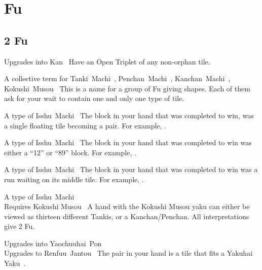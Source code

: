 \section{Fu}\label{core:sec:fu}

\subsection{2 Fu}\label{core:ssec:2-fu}

	{\upgradesto Upgrades into Kan~}
	{Have an Open Triplet of any non-orphan tile. }

	{\upgradesto A collective term for Tanki~Machi~, Penchan~Machi~, Kanchan~Machi~, Kokushi~Musou~}
	{This is a name for a group of Fu giving shapes. Each of them ask for your wait to contain one and only one type of tile.}

	{\upgradesfrom A type of Isshu~Machi~}
	{The block in your hand that was completed to win, was a single floating tile becoming a pair. For example, .}

	{\upgradesfrom A type of Isshu~Machi~}
	{The block in your hand that was completed to win was either a ``12'' or ``89'' block. For example, .}

	{\upgradesfrom A type of Isshu~Machi~}
	{The block in your hand that was completed to win was a run waiting on its middle tile. For example, .}

	{\upgradesfrom A type of Isshu~Machi~\\
	\upgradesfromother Requires Kokushi Musou~}
	{A hand with the Kokushi Musou yaku can either be viewed as thirteen different Tankis, or a Kanchan/Penchan. All interpretations give 2 Fu.}

	{\upgradesto Upgrades into Yaochuuhai~Pon~\\
	\upgradesto Upgrades to Renfuu~Jantou~}
	{The pair in your hand is a tile that fits a Yakuhai Yaku~.}

